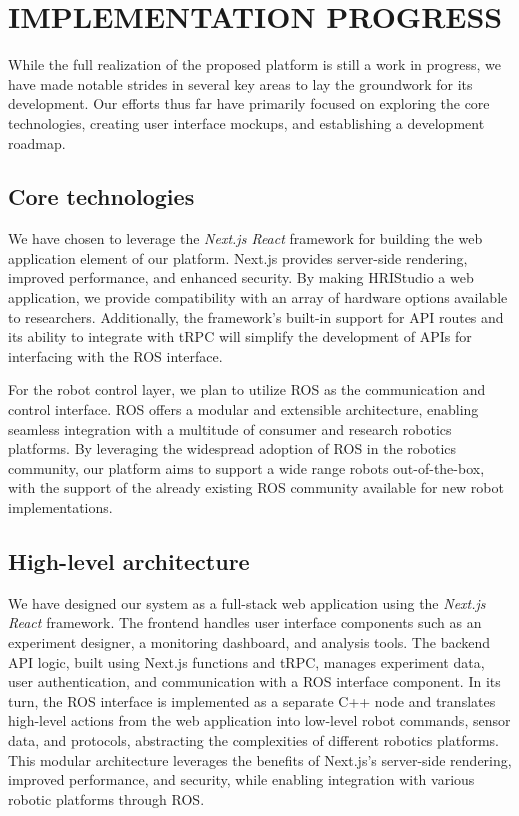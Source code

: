 \documentclass[letterpaper, 10 pt, conference]{ieeeconf}
\begin{document}
\section{IMPLEMENTATION PROGRESS}

While the full realization of the proposed platform is still a work in progress, we have made notable strides in several key areas to lay the groundwork for its development. Our efforts thus far have primarily focused on exploring the core technologies, creating user interface mockups, and establishing a development roadmap.

\subsection{Core technologies}

We have chosen to leverage the \emph{Next.js React} \cite{next} framework for building the web application element of our platform. Next.js provides server-side rendering, improved performance, and enhanced security. By making HRIStudio a web application, we provide compatibility with an array of hardware options available to researchers. Additionally, the framework's built-in support for API routes and its ability to integrate with tRPC will simplify the development of APIs for interfacing with the ROS interface.

For the robot control layer, we plan to utilize ROS as the communication and control interface. ROS offers a modular and extensible architecture, enabling seamless integration with a multitude of consumer and research robotics platforms. By leveraging the widespread adoption of ROS in the robotics community, our platform aims to support a wide range robots out-of-the-box, with the support of the already existing ROS community available for new robot implementations.

\subsection{High-level architecture}

We have designed our system as a full-stack web application using the \emph{Next.js React} framework. \cite{next} The frontend handles user interface components such as an experiment designer, a monitoring dashboard, and analysis tools. The backend API logic, built using Next.js functions and tRPC\cite{trpc}, manages experiment data, user authentication, and communication with a ROS interface component. In its turn, the ROS interface is implemented as a separate C++ node and translates high-level actions from the web application into low-level robot commands, sensor data, and protocols, abstracting the complexities of different robotics platforms. This modular architecture leverages the benefits of Next.js's server-side rendering, improved performance, and security, while enabling integration with various robotic platforms through ROS.
\end{document}
